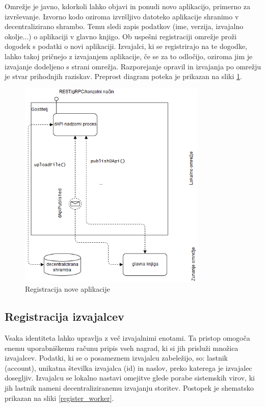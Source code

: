 \documentclass[a4paper, 12pt]{book}
\begin{document}
Omrežje je javno, kdorkoli lahko objavi in ponudi novo aplikacijo, primerno za izvrševanje.
Izvorno kodo oziroma izvršljivo datoteko aplikacije shranimo v decentralizirano shrambo.
Temu sledi zapis podatkov (ime, verzija, izvajalno okolje...) o aplikaciji v glavno knjigo.
Ob uspešni registraciji omrežje proži dogodek s podatki o novi aplikaciji.
Izvajalci, ki se registrirajo na te dogodke, lahko takoj pričnejo z izvajanjem aplikacije, če se za to odločijo, oziroma jim je izvajanje dodeljeno s strani omrežja.
Razporejanje opravil in izvajanja po omrežju je stvar prihodnjih raziskav.
Preprost diagram poteka je prikazan na sliki \ref{register_api}.

\begin{figure}[h]
	\centering
	\includegraphics[width=0.8\textwidth]{slike/register_api.png}
	\caption{Registracija nove aplikacije}
	\label{register_api}
\end{figure}

\subsection{Registracija izvajalcev}
\label{registerWorker}
Vsaka identiteta lahko upravlja z več izvajalnimi enotami.
Ta pristop omogoča enemu uporabniškemu računu pripis vseh nagrad, ki si jih prisluži množica izvajalcev.
Podatki, ki se o posameznem izvajalcu zabeležijo, so: lastnik (account), unikatna številka izvajalca (id) in naslov, preko katerega je izvajalec dosegljiv.
Izvajalcu se lokalno nastavi omejitve glede porabe sistemskih virov, ki jih lastnik nameni decentraliziranemu izvajanju storitev.
Postopek je shematsko prikazan na sliki \ref{register_worker}.
\end{document}
